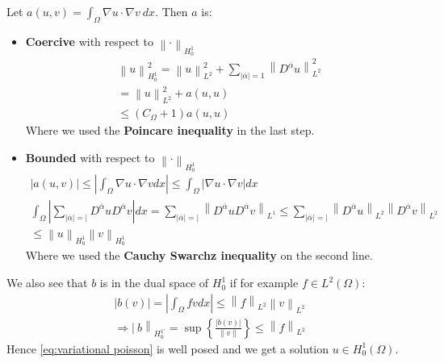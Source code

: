 \documentclass[../Main/main.tex]{subfiles}
\begin{document}
	\begin{example}
		Let $a(u,v) = \int_{\Omega}\nabla u \cdot \nabla v \ dx$. Then $a$ is:
		\begin{itemize}
			\item \textbf{Coercive} with respect to $\left \| \cdot \right \|_{H_0^1}$
			\begin{equation*}
				\begin{gathered}
					\left \| u \right \|^2_{H_0^1} = \left \| u \right \|^2_{L^2} + \sum_{|\overline{\alpha}|=1} \left \| D^{\overline{\alpha}} u \right \|^2_{L^2}\\
					=\left \|u\right \|^2_{L^2} + a(u,u) \\
					\leq (C_{\Omega} + 1)a(u,u)
				\end{gathered}
			\end{equation*}
			Where we used the \textbf{Poincare inequality} in the last step.
			\item \textbf{Bounded} with respect to $\left \| \cdot \right \|_{H_0^1}$
			\begin{equation*}
				\begin{gathered}
					|a(u,v)|\leq |\int_{\Omega}\nabla u \cdot \nabla v dx| \leq \int_{\Omega} |\nabla u \cdot \nabla v| dx \\
					\int_{\Omega} |\sum_{|\overline{\alpha}|=|}D^{\overline{\alpha}}u D^{\overline{\alpha}}v|dx=\sum_{|\overline{\alpha}|=|} \left \| D^{\overline{\alpha}}u D^{\overline{\alpha}}v \right \|_{L^1} \leq \sum_{|\overline{\alpha}|=|} \left \| D^{\overline{\alpha}}u \right \|_{L^2} \left \| D^{\overline{\alpha}}v \right \|_{L^2} \\
					\leq \left \|u \right \|_{H_0^1} \left \| v \right \|_{H_0^1}
				\end{gathered}
			\end{equation*}
			Where we used the \textbf{Cauchy Swarchz inequality} on the second line.
		\end{itemize}
		We also see that $b$ is in the dual space of $H_0^1$ if for example $f\in L^2(\Omega)$:
		\begin{equation*}
			\begin{gathered}
			|b(v)| = |\int_{\Omega} fv dx | \leq \left \|f \right \|_{L^2} \left \| v \right \|_{L^2} \\
			\Rightarrow \left |\ b \right \|_{H_0^{1'}} = \sup\left \{ \frac{|b(v)|}{\left \| v \right \|} \right \} \leq \left \| f \right \|_{L^2}
			\end{gathered}
		\end{equation*}
		Hence \eqref{eq:variational poisson} is well posed and we get a solution $u \in H_0^1(\Omega)$.
	\end{example}
\end{document}
